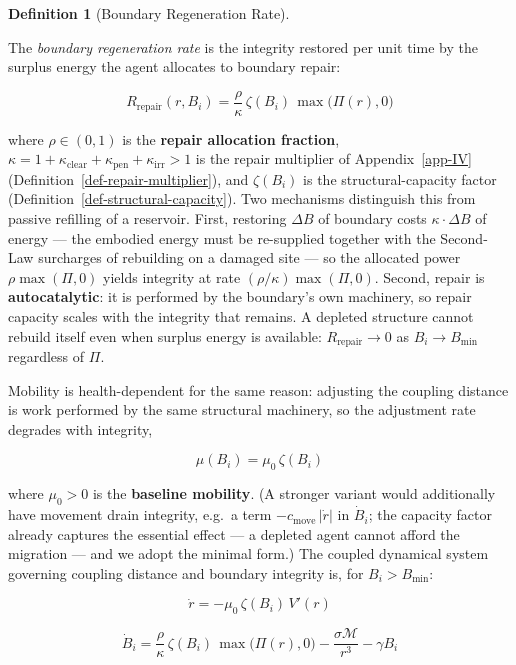 \documentclass[11pt]{article}
\theoremstyle{plain}
\theoremstyle{definition}
\newtheorem{definition}{Definition}
\theoremstyle{remark}
\begin{document}
\begin{definition}[Boundary Regeneration Rate]
\label{def-boundary-regeneration-rate}

The \emph{boundary regeneration rate} is the integrity restored per unit time by the surplus energy the agent allocates to boundary repair:

$$R_{\text{repair}}(r, B_i) = \frac{\rho}{\kappa}\, \zeta(B_i)\, \max\bigl(\Pi(r), 0\bigr)$$

where $\rho \in (0, 1)$ is the \textbf{repair allocation fraction}, $\kappa = 1 + \kappa_{\text{clear}} + \kappa_{\text{pen}} + \kappa_{\text{irr}} > 1$ is the repair multiplier of Appendix~\ref{app-IV} (Definition~\ref{def-repair-multiplier}), and $\zeta(B_i)$ is the structural-capacity factor (Definition~\ref{def-structural-capacity}). Two mechanisms distinguish this from passive refilling of a reservoir. First, restoring $\Delta B$ of boundary costs $\kappa \cdot \Delta B$ of energy — the embodied energy must be re-supplied together with the Second-Law surcharges of rebuilding on a damaged site — so the allocated power $\rho \max(\Pi, 0)$ yields integrity at rate $(\rho/\kappa) \max(\Pi, 0)$. Second, repair is \textbf{autocatalytic}: it is performed by the boundary's own machinery, so repair capacity scales with the integrity that remains. A depleted structure cannot rebuild itself even when surplus energy is available: $R_{\text{repair}} \to 0$ as $B_i \to B_{\min}$ regardless of $\Pi$.
\end{definition}

Mobility is health-dependent for the same reason: adjusting the coupling
distance is work performed by the same structural machinery, so the
adjustment rate degrades with integrity,

\[\mu(B_i) = \mu_0 \, \zeta(B_i)\]

where \(\mu_0 > 0\) is the \textbf{baseline mobility}. (A stronger
variant would additionally have movement drain integrity, e.g.~a term
\(-c_{\text{move}}\,|\dot{r}|\) in \(\dot{B}_i\); the capacity factor
already captures the essential effect --- a depleted agent cannot afford
the migration --- and we adopt the minimal form.) The coupled dynamical
system governing coupling distance and boundary integrity is, for
\(B_i > B_{\min}\):

\[\dot{r} = -\mu_0\, \zeta(B_i)\, V'(r)\]

\[\dot{B}_i = \frac{\rho}{\kappa}\, \zeta(B_i)\, \max\bigl(\Pi(r), 0\bigr) - \frac{\sigma \mathcal{M}}{r^3} - \gamma B_i\]
\end{document}
